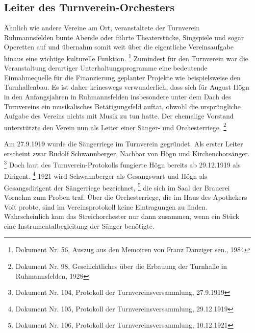 \subsection{Leiter des Turnverein-Orchesters}

\hypertarget{RefHeadingToc100333730}{}Ähnlich wie andere Vereine am Ort,
veranstaltete der Turnverein Ruhmannsfelden bunte Abende oder führte
Theaterstücke, Singspiele und sogar Operetten auf und übernahm somit
weit über die eigentliche Vereinsaufgabe hinaus eine wichtige
kulturelle Funktion. \footnote{Dokument Nr. 56, Auszug aus den Memoiren
von Franz Danziger sen., 1984} Zumindest für den Turnverein war die
Veranstaltung derartiger Unterhaltungsprogramme eine bedeutende
Einnahmequelle für die Finanzierung geplanter Projekte wie
beispielsweise den Turnhallenbau. Es ist daher keineswegs
verwunderlich, dass sich für August Högn in den Anfangsjahren in
Ruhmannsfelden insbesondere unter dem Dach des Turnvereins ein
musikalisches Betätigungsfeld auftat, obwohl die ursprüngliche Aufgabe
des Vereins nichts mit Musik zu tun hatte. Der ehemalige Vorstand
unterstützte den Verein nun als Leiter einer Sänger- und
Orchesterriege. \footnote{Dokument Nr. 98, Geschichtliches über die
Erbauung der Turnhalle in Ruhmannsfelden, 1928}

Am 27.9.1919 wurde die Sängerriege im Turnverein gegründet. Als erster
Leiter erscheint zwar Rudolf Schwannberger, Nachbar von Högn und
Kirchenchorsänger. \footnote{Dokument Nr. 104, Protokoll der
Turnvereinsversammlung, 27.9.1919} Doch laut des Turnverein-Protokolls
fungierte Högn bereits ab 29.12.1919 als Dirigent. \footnote{Dokument
Nr. 105, Protokoll der Turnvereinsversammlung, 29.12.1919} 1921 wird
Schwannberger als Gesangswart und Högn als Gesangsdirigent der
Sängerriege bezeichnet, \footnote{Dokument Nr. 106, Protokoll der
Turnvereinsversammlung, 10.12.1921} die sich im Saal der Brauerei
Vornehm zum Proben traf. Über die Orchesterriege, die im Haus des
Apothekers Voit probte, sind im Vereinsprotokoll keine Eintragungen zu
finden. Wahrscheinlich kam das Streichorchester nur dann zusammen, wenn
ein Stück eine Instrumentalbegleitung der Sänger benötigte.

